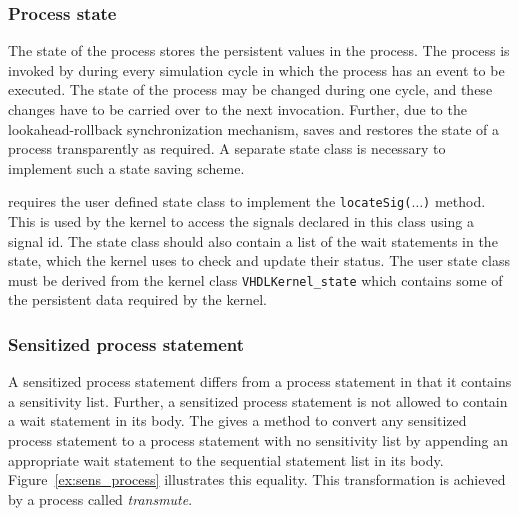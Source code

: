 \documentclass[11pt]{article}
\begin{document}
\subsubsection{Process state}

The state of the process stores the persistent values in the process.
The process is invoked by \warped\/ during every simulation cycle in
which the process has an event to be executed.  The state of the
process may be changed during one cycle, and these changes have to be
carried over to the next invocation.  Further, due to the
lookahead-rollback synchronization mechanism, \warped\/ saves and
restores the state of a process transparently as required.  A separate
state class is necessary to implement such a state saving scheme.

\tyvis\/ requires the user defined state class to implement the
\texttt{locateSig($\ldots$)} method.  This is used by the kernel to access
the signals declared in this class using a signal id.  The state class
should also contain a list of the wait statements in the state, which
the kernel uses to check and update their status.  The user state
class must be derived from the kernel class \texttt{VHDLKernel\_state}
which contains some of the persistent data required by the kernel.

\subsubsection{Sensitized process statement}
  
A sensitized process statement differs from a process statement in
that it contains a sensitivity list.  Further, a sensitized process
statement is not allowed to contain a wait statement in its body.  The
\LRM\/ gives a method to convert any sensitized process statement to a
process statement with no sensitivity list by appending an appropriate
wait statement to the sequential statement list in its body.
Figure~\ref{ex:sens_process} illustrates this equality.  This
transformation is achieved by a process called \textit{transmute}.

\end{document}
